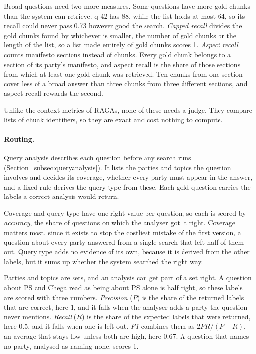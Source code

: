 Broad questions need two more measures. Some questions have more gold chunks
than the system can retrieve. q-42 has 88, while the list holds at most 64, so
its recall could never pass 0.73 however good the search. \emph{Capped recall}
divides the gold chunks found by whichever is smaller, the number of gold
chunks or the length of the list, so a list made entirely of gold chunks
scores 1. \emph{Aspect recall} counts manifesto sections instead of chunks.
Every gold chunk belongs to a section of its party's manifesto, and aspect
recall is the share of those sections from which at least one gold chunk was
retrieved. Ten chunks from one section cover less of a broad answer than three
chunks from three different sections, and aspect recall rewards the second.

Unlike the context metrics of RAGAs, none of these needs a judge. They compare
lists of chunk identifiers, so they are exact and cost nothing to compute.

\paragraph{Routing.} Query analysis describes each question before any search
runs (Section~\ref{subsec:queryanalysis}). It lists the parties and topics the
question involves and decides its coverage, whether every party must appear in
the answer, and a fixed rule derives the query type from these. Each gold
question carries the labels a correct analysis would return.

Coverage and query type have one right value per question, so each is scored
by \emph{accuracy}, the share of questions on which the analyser got it right.
Coverage matters most, since it exists to stop the costliest mistake of the
first version, a question about every party answered from a single search that
left half of them out. Query type adds no evidence of its own, because it is
derived from the other labels, but it sums up whether the system searched the
right way.

Parties and topics are sets, and an analysis can get part of a set right. A
question about PS and Chega read as being about PS alone is half right, so
these labels are scored with three numbers. \emph{Precision} ($P$) is the
share of the returned labels that are correct, here 1, and it falls when the
analyser adds a party the question never mentions. \emph{Recall} ($R$) is the
share of the expected labels that were returned, here 0.5, and it falls when
one is left out. \emph{F1} combines them as $2PR/(P+R)$, an average that stays
low unless both are high, here 0.67. A question that names no party, analysed
as naming none, scores 1.

